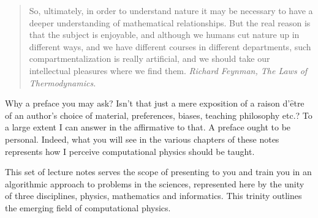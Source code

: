 \preface

\begin{quotation}
So, ultimately, in order to understand nature it may be necessary to
have a deeper understanding of mathematical relationships. But the
real reason is that the subject is enjoyable, and although we humans
cut nature up in different ways, and we have different courses in
different departments, such compartmentalization is really artificial,
and we should take our intellectual pleasures where we find them. 
{\em Richard Feynman, The Laws of Thermodynamics.}
\end{quotation}

Why a preface you may ask? Isn't that just a mere exposition of a
raison d'$\mathrm{\hat{e}}$tre of an author's choice of material,
preferences, biases, teaching philosophy etc.?  To a large extent I
can answer in the affirmative to that. A preface ought to be personal.
Indeed, what you will see in the various chapters of these notes
represents how I perceive computational physics should be taught.

 This set of lecture notes serves the scope of presenting to you and
train you in an algorithmic approach to problems in the sciences,
represented here by the unity of three disciplines, physics,
mathematics and informatics. This trinity outlines the emerging field
of computational physics.

